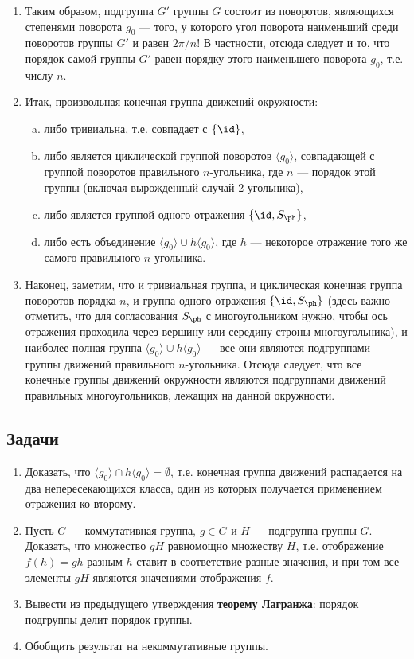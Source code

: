 \begin{enumerate}
\item Таким образом, подгруппа $G'$ группы $G$ состоит из поворотов, являющихся степенями поворота $g_0$ --- того, у которого угол поворота наименьший среди поворотов группы $G'$ и равен $2\pi/n$! В частности, отсюда следует и то, что порядок самой группы $G'$ равен порядку этого наименьшего поворота $g_0$, т.е. числу $n$.
\item Итак, произвольная конечная группа движений окружности:
\begin{enumerate}[a)]
\item либо тривиальна, т.е. совпадает с $\{\id\}$,
\item либо является циклической группой поворотов $\langle g_0\rangle$, совпадающей с группой поворотов правильного $n$-угольника, где $n$ --- порядок этой группы (включая вырожденный случай 2-угольника),
\item либо является группой одного отражения $\{\id,S_\ph\}$,
\item либо есть объединение $\langle g_0\rangle\cup h\langle g_0\rangle$, где $h$ --- некоторое отражение того же самого правильного $n$-угольника.
\end{enumerate}
\item Наконец, заметим, что и тривиальная группа, и циклическая конечная группа поворотов порядка $n$, и группа одного отражения $\{\id,S_\ph\}$ (здесь важно отметить, что для согласования $S_\ph$ с многоугольником нужно, чтобы ось отражения проходила через вершину или середину строны многоугольника), и наиболее полная группа $\langle g_0\rangle\cup h\langle g_0\rangle$  --- все они являются подгруппами группы движений правильного $n$-угольника. Отсюда следует, что все конечные группы движений окружности являются подгруппами движений правильных многоугольников, лежащих на данной окружности.
\end{enumerate}

\subsection*{Задачи}
\begin{enumerate}
\item Доказать, что $\langle g_0\rangle\cap h\langle g_0\rangle = \emptyset$, т.е. конечная группа движений распадается на два непересекающихся класса, один из которых получается применением отражения ко второму.
\item Пусть $G$ --- коммутативная группа, $g\in G$ и $H$ --- подгруппа группы $G$. Доказать, что множество $gH$ равномощно множеству $H$, т.е. отображение $f(h)=gh$ разным $h$ ставит в соответствие разные значения, и при том все элементы $gH$ являются значениями отображения $f$.
\item Вывести из предыдущего утверждения \textbf{теорему Лагранжа}: порядок подгруппы делит порядок группы.
\item Обобщить результат на некоммутативные группы.
\end{enumerate}

